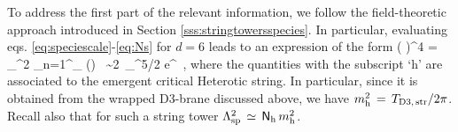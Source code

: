 To address the first part of the relevant information, we follow the field-theoretic approach introduced in Section \ref{sss:stringtowersspecies}. In particular, evaluating eqs. \eqref{eq:speciescale}-\eqref{eq:Ns} for $d=6$ leads to an expression of the form
%
\beq
		\left ( \right )^4 =\, _{}^2 \sum_{n=1}^{_{}} () \, \sim 2\ _{}^{5/2} e^{}\, ,
\label{eq:maxstringlevel6d}
\eeq
%
where the quantities with the subscript `h' are associated to the emergent critical Heterotic string. In particular, since it is obtained from the wrapped D3-brane discussed above, we have $m_{\text{h}}^2\, =\, T_{\rm D3,\, str}/2 \pi$. Recall also that for such a string tower $\Lambda_{\text{sp}}^2 \, \simeq \, \mathsf{N}_{\text{h}} \, m_{\text{h}}^2$.
		
